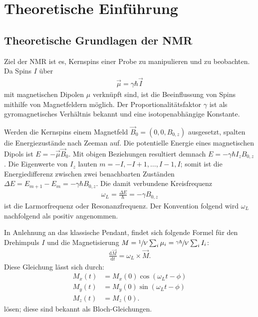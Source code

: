 \chapter{Theoretische Einführung}
\label{chapter:theo}

\section{Theoretische Grundlagen der NMR} \label{section:theo:grundlagen}


Ziel der NMR ist es, Kernspins einer Probe zu manipulieren und zu beobachten.
Da Spins $I$ über
\begin{align}
    \vec{\mu} = \gamma \hbar \vec{I}
\end{align}
mit magnetischen Dipolen $\mu$ verknüpft sind, ist die Beeinflussung von Spins mithilfe von Magnetfeldern möglich. Der Proportionalitätsfaktor $\gamma$ ist als gyromagnetisches Verhältnis bekannt und eine isotopenabhängige Konstante.

Werden die Kernspins einem Magnetfeld $\vec{B}_0 = (0, 0, B_{0,z})$ ausgesetzt, spalten die Energiezustände nach Zeeman auf. Die potentielle Energie eines magnetischen Dipols ist $E = - \vec{\mu} \vec{B}_0$. Mit obigen Beziehungen resultiert demnach $E = - \gamma \hbar I_z B_{0,z}$. Die Eigenwerte von $I_z$ lauten $m = -I, -I + 1, \dots, I - 1, I$; somit ist die Energiedifferenz zwischen zwei benachbarten Zuständen $\Delta E = E_{m+1} - E_{m} = - \gamma \hbar B_{0,z}$. Die damit verbundene Kreisfrequenz
\begin{align}
    \omega_L = \frac{\Delta E}{\hbar} = - \gamma B_{0,z} \label{eqn:lamorfrequenz}
\end{align}
ist die Larmorfrequenz oder Resonanzfrequenz. Der Konvention folgend wird $\omega_L$ nachfolgend als positiv angenommen.



In Anlehnung an das klassische Pendant, findet sich folgende Formel für den Drehimpuls $I$ und die Magnetisierung $M = \sfrac{1}{V} \sum_i \mu_i = \sfrac{\gamma \hbar}{V} \sum_i I_i$:
\begin{align}
    \frac{\text{d}\vec{M}}{\text{d}t} = \omega_L \times \vec{M}. \label{eqn:drehmoment}
\end{align}
Diese Gleichung lässt sich durch:
\begin{align}
    M_x (t) &= M_x(0) \cos(\omega_L t - \phi) \\
    M_y (t) &= M_y(0) \sin(\omega_L t - \phi) \\
    M_z (t) &= M_z(0).
\end{align}
lösen; diese sind bekannt als Bloch-Gleichungen.

